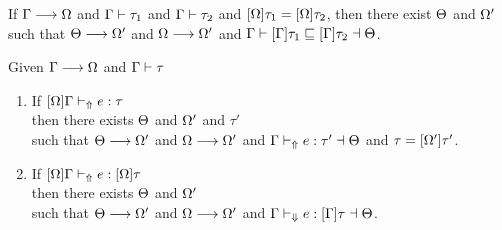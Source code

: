 \begin{theorem}

If $\Gamma \longrightarrow \Omega$ and $\Gamma \vdash \tau_1$ and $\Gamma \vdash \tau_2$ and $[\Omega]\tau_1 = [\Omega]\tau_2$, then there exist $\Theta$ and $\Omega'$ such that $\Theta \longrightarrow \Omega'$ and $\Omega \longrightarrow \Omega'$ and $\Gamma \vdash [\Gamma]\tau_1 \sqsubseteq [\Gamma]\tau_2 \dashv \Theta$.
\end{theorem}

\begin{theorem}

Given $\Gamma \longrightarrow \Omega$ and $\Gamma \vdash \tau$
\begin{enumerate}
    \item If $[\Omega]\Gamma \vdash_\Uparrow e : \tau$\\
          then there exists $\Theta$ and $\Omega'$ and $\tau'$\\
          such that $\Theta \longrightarrow \Omega'$ and $\Omega \longrightarrow \Omega'$ and $\Gamma \vdash_\Uparrow e:\tau' \dashv \Theta$ and $\tau = [\Omega']\tau'$.
    \item If $[\Omega]\Gamma \vdash_\Uparrow e : [\Omega]\tau$\\
          then there exists $\Theta$ and $\Omega'$\\
          such that $\Theta \longrightarrow \Omega'$ and $\Omega \longrightarrow \Omega'$ and $\Gamma \vdash_\Downarrow e: [\Gamma]\tau \dashv \Theta$.
\end{enumerate}
\end{theorem}
